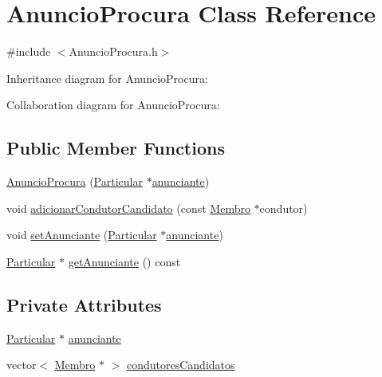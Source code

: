 \hypertarget{class_anuncio_procura}{\section{Anuncio\+Procura Class Reference}
\label{class_anuncio_procura}
}


{\ttfamily \#include $<$Anuncio\+Procura.\+h$>$}



Inheritance diagram for Anuncio\+Procura\+:


Collaboration diagram for Anuncio\+Procura\+:
\subsection*{Public Member Functions}
\begin{DoxyCompactItemize}
\item 
\hyperlink{class_anuncio_procura_a03743cdc7492d168d554b8dcd56982aa}{Anuncio\+Procura} (\hyperlink{class_particular}{Particular} $\ast$\hyperlink{class_anuncio_procura_aa6a47ee352a486c19e0a366cd754f097}{anunciante})
\item 
void \hyperlink{class_anuncio_procura_aa013bc4735a069bb456dfbeee5f0249c}{adicionar\+Condutor\+Candidato} (const \hyperlink{class_membro}{Membro} $\ast$condutor)
\item 
void \hyperlink{class_anuncio_procura_a303be648c388693e6b92e6bf467c06ff}{set\+Anunciante} (\hyperlink{class_particular}{Particular} $\ast$\hyperlink{class_anuncio_procura_aa6a47ee352a486c19e0a366cd754f097}{anunciante})
\item 
\hyperlink{class_particular}{Particular} $\ast$ \hyperlink{class_anuncio_procura_aadc1d2f42fd3a9629498065b931e9134}{get\+Anunciante} () const 
\end{DoxyCompactItemize}
\subsection*{Private Attributes}
\begin{DoxyCompactItemize}
\item 
\hyperlink{class_particular}{Particular} $\ast$ \hyperlink{class_anuncio_procura_aa6a47ee352a486c19e0a366cd754f097}{anunciante}
\item 
vector$<$ \hyperlink{class_membro}{Membro} $\ast$ $>$ \hyperlink{class_anuncio_procura_afd57f0f4bf61422798fdb964c3fe860b}{condutores\+Candidatos}
\end{DoxyCompactItemize}


